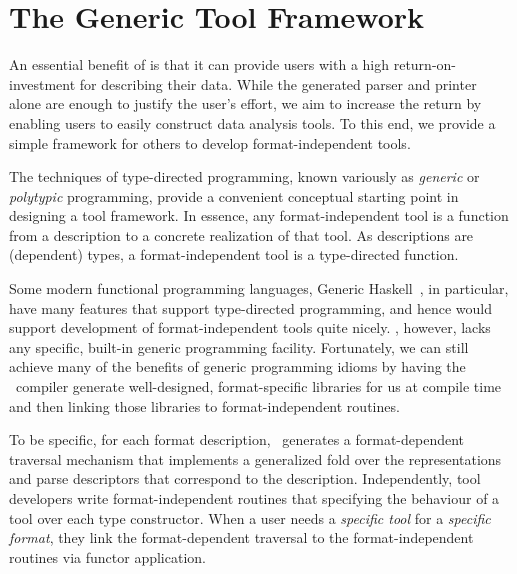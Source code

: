 \section{The Generic Tool Framework}
\label{sec:gen-tool}

An essential benefit of \padsml{} is that it can provide users with a
high return-on-investment for describing their data. While the
generated parser and printer alone are enough to justify the user's
effort, we aim to increase the return by enabling users to easily
construct data analysis tools.
To this end, we provide a simple framework for others to develop 
format-independent tools.

The techniques of type-directed programming, known variously as
\textit{generic} or \textit{polytypic} programming, provide a
convenient conceptual starting point in designing a tool framework.
In essence, any format-independent tool is a function from a description to 
a concrete realization of that tool. 
As \padsml{} descriptions are (dependent) types, a 
format-independent tool is a type-directed function.


Some modern functional programming languages,
Generic Haskell~\cite{hinze+:generic-haskell}, in particular,
have many features that support type-directed programming, and
hence would support development of format-independent tools quite nicely. 
\ocaml{}, however, lacks any specific, built-in generic programming facility.
Fortunately, we can still achieve many of the benefits of generic 
programming idioms by having the \padsml\ compiler generate
well-designed, format-specific libraries for us at compile time
and then linking those libraries to format-independent routines.

To be specific, for each format description, \padsml\ generates a
format-dependent traversal mechanism that implements a generalized
fold over the representations and parse descriptors that correspond to
the description. Independently, tool developers write format-independent
routines that specifying the behaviour of a tool over each
\padsml{} type constructor. When a user needs a {\em specific tool} for a
{\em specific format}, they link the format-dependent 
traversal to the format-independent routines via 
functor application.

